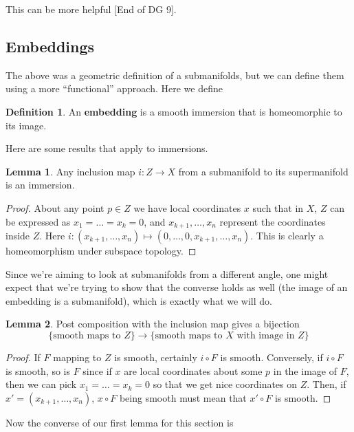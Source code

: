 \documentclass{article}
\theoremstyle{definition}
\newtheorem{definition}{Definition}
\newtheorem{lemma}{Lemma}
\begin{document}
This can be more helpful [End of DG 9].

\subsection{Embeddings}

The above was a geometric definition of a submanifolds, but we can define them
using a more ``functional'' approach. Here we define

\begin{definition}
  An \textbf{embedding} is a smooth immersion that is homeomorphic to its image.
\end{definition}

Here are some results that apply to immersions.

\begin{lemma}
Any inclusion map $i : Z \to X$ from a submanifold to its
supermanifold is an immersion.
\end{lemma}
\begin{proof}
About any point $p \in Z$ we have local coordinates $x$ such that in $X$, $Z$
can be expressed as $x_1 = \dots = x_k = 0$, and $x_{k + 1}, \dots, x_n$
represent the coordinates inside $Z$. Here $i : (x_{k + 1}, \dots,
x_n) \mapsto (0, \dots, 0, x_{k + 1}, \dots, x_n)$. This is clearly a
homeomorphism under subspace topology. 
\end{proof}

Since we're aiming to look at submanifolds from a different angle, one might
expect that we're trying to show that the converse holds as well (the image of
an embedding is a submanifold), which is exactly what we will do.

\begin{lemma}
  Post composition with the inclusion map gives a bijection
  $$ \{\text{smooth maps to } Z\} \to \{\text{smooth maps to } X \text{ with
    image in } Z\} $$
\end{lemma}

\begin{proof}
  If $F$ mapping to $Z$ is smooth, certainly $i \circ F$ is smooth. Conversely,
  if $i \circ F$ is smooth, so is $F$ since if $x$ are local coordinates about
  some $p$ in the image of $F$, then we can pick $x_1 = \dots = x_k = 0$ so that
  we get nice coordinates on $Z$. Then, if $x' = (x_{k + 1}, \dots, x_n)$, $x
  \circ F$ being smooth must mean that $x' \circ F$ is smooth.
\end{proof}

Now the converse of our first lemma for this section is
\end{document}
